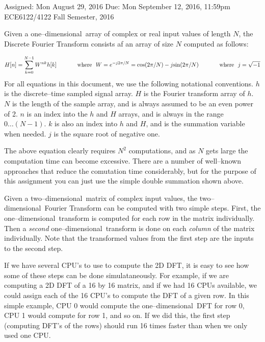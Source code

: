 \documentclass[10pt]{article}
\begin{document}
{Assigned: Mon August 29, 2016}
{Due: Mon September 12, 2016, 11:59pm}
{ECE6122/4122}
{Fall Semester, 2016}

\def\td{two--dimensional}
\def\od{one--dimensional}
Given a \od\ array of complex or real input values of length $N$,
the Discrete Fourier Transform consists af an array of size $N$ computed
as follows:

\begin{equation}
\label{Eq:DFT}
H[n] = \sum_{k=0}^{N-1} W^{nk}h[k]
\hspace{0.5in}\mbox{where}\ \ 
W = e^{-j2\pi/N} = \mbox{cos}(2\pi/N)-j\mbox{sin}(2\pi/N)
\hspace{0.5in}\mbox{where}\ \ 
j = \sqrt{-1}
\end{equation}
For all equations in this document, we use the following notational
conventions.
$h$ is the discrete--time sampled signal array.
$H$ is the Fourier transform array of $h$. 
$N$ is the length of the sample array, and is always
assumed to be an even power of 2.
$n$ is an index into the $h$ and $H$ arrays, and is always in the
range $0 \ldots (N-1)$.
$k$ is also an index into $h$ and $H$, and is the summation
variable when needed.
$j$ is the square root of negative one.

The above equation clearly requires $N^2$ computations, and as $N$
gets large the computation time can become excessive.  There are
a number of well--known approaches that reduce the comutation time
considerably, but for the purpose of this assignment you can just
use the simple double summation shown above.

Given a \td\ matrix of complex input values, the \td\
Fourier Transform can be computed with two simple steps.  First, the
\od\ transform is computed for each row in the matrix 
individually.  Then a {\em second} \od\ transform is done on each
{\em column} of the matrix individually.
Note that the transformed values from the
first step are the inputs to the second step.

If we have several CPU's to use to compute the 2D DFT, it is easy to see
how some of these steps can be done simulataneously.  For example, if we
are computing a 2D DFT of a 16 by 16 matrix, and if we had 16 CPUs available,
we could assign each of the
16 CPU's to compute the DFT of a given row.  In this simple example,
CPU 0 would compute the \od\ DFT for row 0, CPU 1 would compute for row 1,
and so on.  If we did this, the first
step (computing DFT's of the rows) should run 16 times faster than when
we only used one CPU.
\end{document}
